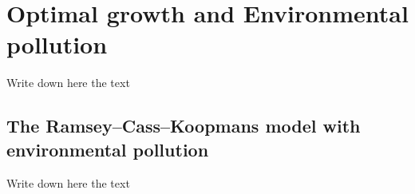 \section{Optimal growth and Environmental pollution} \label{Sec:opt-grow-env-poll}
Write down here the text

\subsection{The Ramsey–Cass–Koopmans model with environmental pollution}
Write down here the text
